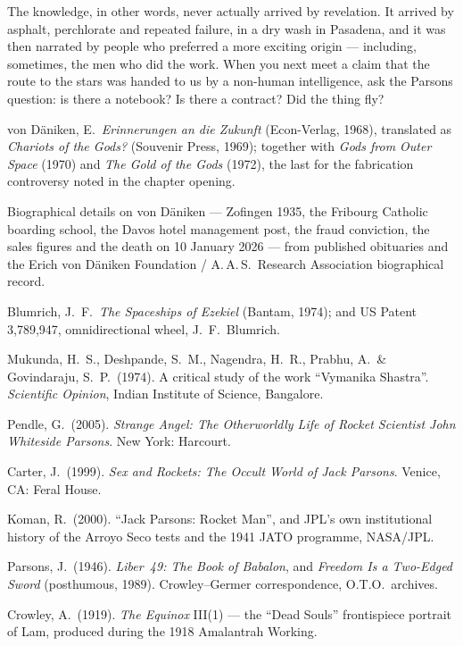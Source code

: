The knowledge, in other words, never actually arrived by revelation. It arrived by asphalt,
perchlorate and repeated failure, in a dry wash in Pasadena, and it was then narrated by people
who preferred a more exciting origin --- including, sometimes, the men who did the work. When you
next meet a claim that the route to the stars was handed to us by a non-human intelligence, ask
the Parsons question: is there a notebook? Is there a contract? Did the thing fly?

\begin{srcnotes}
\item von Däniken, E.\ \emph{Erinnerungen an die Zukunft} (Econ-Verlag, 1968), translated as
\emph{Chariots of the Gods?} (Souvenir Press, 1969); together with \emph{Gods from Outer Space}
(1970) and \emph{The Gold of the Gods} (1972), the last for the fabrication controversy noted in
the chapter opening.
\item Biographical details on von Däniken --- Zofingen 1935, the Fribourg Catholic boarding school,
the Davos hotel management post, the fraud conviction, the sales figures and the death on 10 January
2026 --- from published obituaries and the Erich von Däniken Foundation / A.\,A.\,S.\ Research
Association biographical record.
\item Blumrich, J.\ F.\ \emph{The Spaceships of Ezekiel} (Bantam, 1974); and US Patent 3,789,947,
omnidirectional wheel, J.\ F.\ Blumrich.
\item Mukunda, H.\ S., Deshpande, S.\ M., Nagendra, H.\ R., Prabhu, A.\ \& Govindaraju, S.\ P.\
(1974). A critical study of the work ``Vymanika Shastra''. \emph{Scientific Opinion}, Indian
Institute of Science, Bangalore.
\item Pendle, G.\ (2005). \emph{Strange Angel: The Otherworldly Life of Rocket Scientist John
Whiteside Parsons}. New York: Harcourt.
\item Carter, J.\ (1999). \emph{Sex and Rockets: The Occult World of Jack Parsons}. Venice, CA:
Feral House.
\item Koman, R.\ (2000). ``Jack Parsons: Rocket Man'', and JPL's own institutional history of
the Arroyo Seco tests and the 1941 JATO programme, NASA/JPL.
\item Parsons, J.\ (1946). \emph{Liber~49: The Book of Babalon}, and \emph{Freedom Is a Two-Edged
Sword} (posthumous, 1989). Crowley--Germer correspondence, O.T.O.\ archives.
\item Crowley, A.\ (1919). \emph{The Equinox} III(1) --- the ``Dead Souls'' frontispiece portrait
of Lam, produced during the 1918 Amalantrah Working.

\end{srcnotes}
